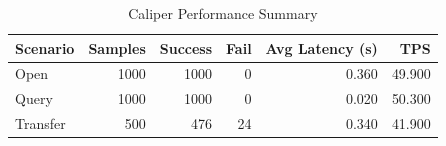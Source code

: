 \begin{table}
\caption{Caliper Performance Summary}
\label{tab:caliper_round}
\begin{tabular}{lrrrrr}
\toprule
Scenario & Samples & Success & Fail & Avg Latency (s) & TPS \\
\midrule
Open & 1000 & 1000 & 0 & 0.360 & 49.900 \\
Query & 1000 & 1000 & 0 & 0.020 & 50.300 \\
Transfer & 500 & 476 & 24 & 0.340 & 41.900 \\
\bottomrule
\end{tabular}
\end{table}

